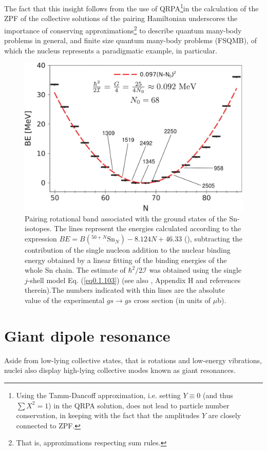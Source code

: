The fact that this insight follows from the use of QRPA\footnote{Using the Tamm-Dancoff approximation, i.e. setting $Y\equiv0$ (and thus $\sum X^2=1$) in the QRPA solution,  does not lead to particle number conservation, in keeping with the fact that the amplitudes $Y$ are closely connected to ZPF.}in the calculation of the ZPF of the collective solutions of the pairing Hamiltonian underscores the importance of conserving approximations\footnote{That is, approximations respecting sum rules.} to describe quantum many-body problems in general, and  finite size quantum many-body problems (FSQMB), of which the nucleus represents a paradigmatic example, in particular. 
\begin{figure}
	\centerline {
		\includegraphics*[width=12cm, angle=0.]{introduccion/figs/fig0_4_5_v3}
	}
	\caption{Pairing rotational band associated with the ground states of the Sn-isotopes. The lines represent the energies calculated according to the expression $BE = B( ^{50+N}\text{Sn}_N ) - 8.124N + 46.33$ (\cite{Brink:05}), subtracting the contribution of the single nucleon addition to the nuclear binding		energy obtained by a linear fitting of the binding energies of the whole Sn chain. The estimate of $\hbar^2/2\mathcal I$ was obtained using the single $j$-shell model Eq. (\ref{eq0.1.103}) (see also  \cite{Brink:05}, Appendix H and references therein).The numbers indicated with thin lines  are the absolute value of the experimental $gs\to gs$ cross section (in units of $\mu $b).}
	\label{fig0.4.5}
\end{figure}
\section{Giant dipole resonance}\label{S1.5}
Aside from low-lying collective states, that is rotations and low-energy vibrations, nuclei also display high-lying collective modes known as giant resonances.


